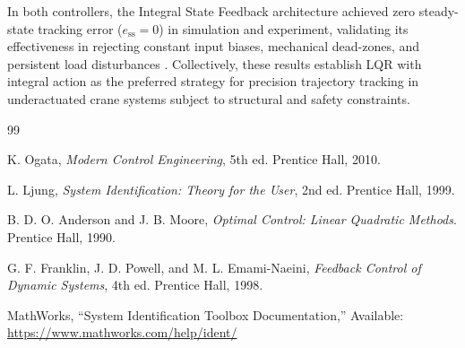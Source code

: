 \documentclass[journal,twocolumn]{IEEEtran}
\begin{document}
In both controllers, the Integral State Feedback architecture achieved zero steady-state 
tracking error ($e_{\text{ss}} = 0$) in simulation and experiment, validating its effectiveness 
in rejecting constant input biases, mechanical dead-zones, and persistent load 
disturbances \cite{franklin}. Collectively, these results establish LQR with integral action as the 
preferred strategy for precision trajectory tracking in underactuated crane systems 
subject to structural and safety constraints.


\begin{thebibliography}{99}

K. Ogata,
\textit{Modern Control Engineering},
5th ed.
Prentice Hall, 2010.

L. Ljung,
\textit{System Identification: Theory for the User},
2nd ed.
Prentice Hall, 1999.

B. D. O. Anderson and J. B. Moore,
\textit{Optimal Control: Linear Quadratic Methods}.
Prentice Hall, 1990.

G. F. Franklin, J. D. Powell, and M. L. Emami-Naeini,
\textit{Feedback Control of Dynamic Systems},
4th ed.
Prentice Hall, 1998.

MathWorks,
``System Identification Toolbox Documentation,'' Available:
\url{https://www.mathworks.com/help/ident/}

\end{thebibliography}
\end{document}
